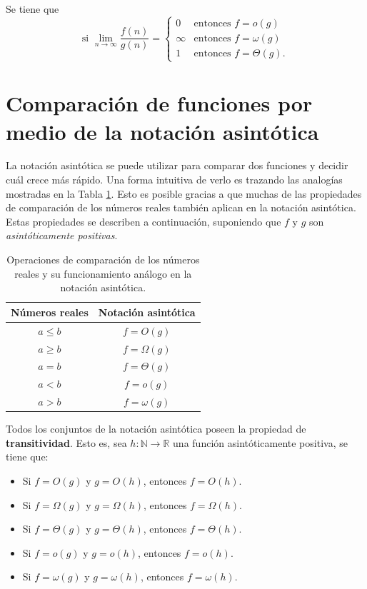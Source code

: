\begin{prop}
  Se tiene que
  \[
    \text{si }\lim_{n\to\infty}\dfrac{f(n)}{g(n)}=\begin{cases}
    0 & \text{entonces }f=o(g)\\
    \infty & \text{entonces }f=\omega(g)\\
    1 & \text{entonces }f=\Theta(g).
    \end{cases}
  \]
\end{prop}

\section{Comparación de funciones por medio de la notación asintótica}

La notación asintótica se puede utilizar para comparar dos funciones y decidir cuál crece más rápido. 
Una forma intuitiva de verlo es trazando las analogías mostradas en la Tabla \ref{tab:func-comp}. 
Esto es posible gracias a que muchas de las propiedades de comparación de los números reales también aplican en la notación asintótica. 
Estas propiedades se describen a continuación, suponiendo que \(f\) y \(g\) son \emph{asintóticamente positivas}.

\begin{table}
  \label{tab:func-comp}
  \caption{Operaciones de comparación de los números reales y su funcionamiento análogo en la notación asintótica.}
  \centering
  \begin{tabular}{cc}
    \toprule 
      Números reales & Notación asintótica\tabularnewline
    \midrule
      \(a\leq b\) & \(f=O(g)\)\tabularnewline
      \(a\ge b\) & \(f=\Omega(g)\)\tabularnewline
      \(a=b\) & \(f=\Theta(g)\)\tabularnewline
      \(a<b\) & \(f=o(g)\)\tabularnewline
      \(a>b\) & \(f=\omega(g)\)\tabularnewline
    \bottomrule
  \end{tabular}
\end{table}

Todos los conjuntos de la notación asintótica poseen la propiedad de \textbf{transitividad}.
Esto es, sea \(h:\mathbb{N}\to\mathbb{R}\) una función asintóticamente positiva, se tiene que:
\begin{itemize}
  \item Si \(f=O(g)\) y \(g=O(h)\), entonces \(f=O(h)\).
  \item Si \(f=\Omega(g)\) y \(g=\Omega(h)\), entonces \(f=\Omega(h)\).
  \item Si \(f=\Theta(g)\) y \(g=\Theta(h)\), entonces \(f=\Theta(h)\).
  \item Si \(f=o(g)\) y \(g=o(h)\), entonces \(f=o(h)\).
  \item Si \(f=\omega(g)\) y \(g=\omega(h)\), entonces \(f=\omega(h)\).
\end{itemize}


